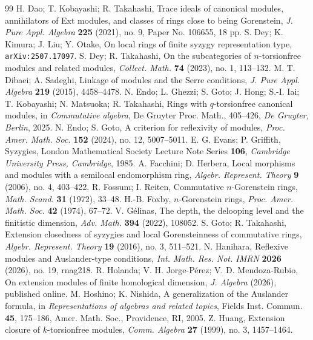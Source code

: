 \documentclass{amsart}
\theoremstyle{definition}
\theoremstyle{remark}
\numberwithin{equation}{thm}
\begin{document}
\begin{thebibliography}{99}
{\sc H. Dao; T. Kobayashi; R. Takahashi}, Trace ideals of canonical modules, annihilators of Ext modules, and classes of rings close to being Gorenstein, {\em J. Pure Appl. Algebra} {\bf 225} (2021), no. 9, Paper No. 106655, 18 pp.
{\sc S. Dey; K. Kimura; J. Liu; Y. Otake}, On local rings of finite syzygy representation type, {\tt arXiv:2507.17097}.
{\sc S. Dey; R. Takahashi}, On the subcategories of $n$-torsionfree modules and related modules, {\em Collect. Math.} {\bf 74} (2023), no. 1, 113--132.
{\sc M. T. Dibaei; A. Sadeghi}, Linkage of modules and the Serre conditions, {\em J. Pure Appl. Algebra} {\bf 219} (2015), 4458--4478.
{\sc N. Endo; L. Ghezzi; S. Goto; J. Hong; S.-I. Iai; T. Kobayashi; N. Matsuoka; R. Takahashi}, Rings with $q$-torsionfree canonical modules, in {\em Commutative algebra}, De Gruyter Proc. Math., 405--426, {\em De Gruyter, Berlin}, 2025.
{\sc N. Endo; S. Goto}, A criterion for reflexivity of modules, {\em Proc. Amer. Math. Soc.} {\bf 152} (2024), no. 12, 5007--5011.
{\sc E. G. Evans; P. Griffith}, Syzygies, London Mathematical Society Lecture Note Series {\bf 106}, {\em Cambridge University Press, Cambridge}, 1985.
{\sc A. Facchini; D. Herbera}, Local morphisms and modules with a semilocal endomorphism ring, {\em Algebr. Represent. Theory} {\bf 9} (2006), no. 4, 403--422.
{\sc R. Fossum; I. Reiten}, Commutative $n$-Gorenstein rings, {\em Math. Scand.} {\bf 31} (1972), 33--48.
{\sc H.-B. Foxby}, $n$-Gorenstein rings, {\em Proc. Amer. Math. Soc.} {\bf 42} (1974), 67--72.
{\sc V. G\'{e}linas}, The depth, the delooping level and the finitistic dimension, {\em Adv. Math.} {\bf 394} (2022), 108052.
{\sc S. Goto; R. Takahashi}, Extension closedness of syzygies and local Gorensteinness of commutative rings, {\em Algebr. Represent. Theory} {\bf 19} (2016), no. 3, 511--521.
{\sc N. Hanihara}, Reflexive modules and Auslander-type conditions, {\em Int. Math. Res. Not. IMRN} {\bf 2026} (2026), no. 19, rnag218.
{\sc R. Holanda; V. H. Jorge-P\'erez; V. D. Mendoza-Rubio}, On extension modules of finite homological dimension, {\em J. Algebra} (2026), published online.
{\sc M. Hoshino; K. Nishida}, A generalization of the Auslander formula, in {\em Representations of algebras and related topics}, Fields Inst. Commun. {\bf 45}, 175--186, Amer. Math. Soc., Providence, RI, 2005.
{\sc Z. Huang}, Extension closure of $k$-torsionfree modules, {\em Comm. Algebra} {\bf 27} (1999), no. 3, 1457--1464.

\end{thebibliography}
\end{document}
